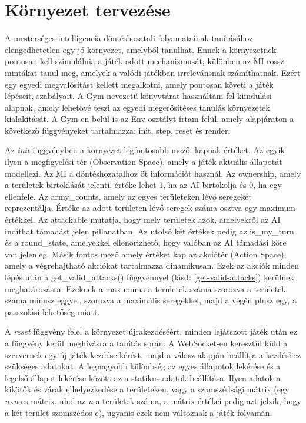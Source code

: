 \documentclass[
]{thesis-ekf}
\theoremstyle{definition}
\theoremstyle{remark}
\begin{document}
	\section{Környezet tervezése}
	\label{környezet-tervezése}
	
	A mesterséges intelligencia döntéshozatali folyamatainak tanításához elengedhetetlen egy jó környezet, amelyből tanulhat. Ennek a környezetnek pontosan kell szimulálnia a játék adott mechanizmusát, különben az MI rossz mintákat tanul meg, amelyek a valódi játékban irrelevánsnak számíthatnak. Ezért egy egyedi megvalósítást kellett megalkotni, amely pontosan követi a játék lépéseit, szabályait. A Gym nevezetű könyvtárat használtam fel kiindulási alapnak, amely lehetővé teszi az egyedi megerősítéses tanulás környezetek kialakítását. A Gym-en belül is az Env osztályt írtam felül, amely alapjáraton a következő függvényeket tartalmazza: init, step, reset és render. 
	
	Az \emph{init} függvényben a környezet legfontosabb mezői kapnak értéket. Az egyik ilyen a megfigyelési tér (Observation Space), amely a játék aktuális állapotát modellezi. Az MI a döntéshozatalhoz öt információt használ. Az ownership, amely a területek birtoklását jelenti, értéke lehet 1, ha az AI birtokolja és 0, ha egy ellenfele. Az army\_counts, amely az egyes területeken lévő seregeket reprezentálja. Értéke az adott területen lévő seregek száma osztva egy maximum értékkel. Az attackable mutatja, hogy mely területek azok, amelyekről az AI indíthat támadást jelen pillanatban. Az utolsó két értékek pedig az is\_my\_turn és a round\_state, amelyekkel ellenőrizhető, hogy valóban az AI támadási köre van jelenleg. Másik fontos mező amely értéket kap az akciótér (Action Space), amely a végrehajtható akciókat tartalmazza dinamikusan. Ezek az akciók minden lépés után a get\_valid\_attacks() függvénnyel (lásd: \ref{get-valid-attacks}) kerülnek meghatározásra. Ezeknek a maximuma a területek száma szorozva a területek száma mínusz eggyel, szorozva a maximális seregekkel, majd a végén plusz egy, a passzolási lehetőség miatt. 
	
	
	
	A \emph{reset} függvény felel a környezet újrakezdéséért, minden lejátszott játék után ez a függvény kerül meghívásra a tanítás során. A WebSocket-en keresztül küld a szervernek egy új játék kezdése kérést, majd a válasz alapján beállítja a kezdéshez szükséges adatokat. A legnagyobb különbség az egyes állapotok lekérése és a legelső állapot lekérése között az a statikus adatok beállítása. Ilyen adatok a kikötők és várak elhelyezkedése a területeken, vagy a szomszédsági mátrix (egy \emph{n}x\emph{n}-es mátrix, ahol az \emph{n} a területek száma, a mátrix értékei pedig azt jelzik, hogy a két terület szomszédos-e), ugyanis ezek nem változnak a játék folyamán.
	
\end{document}

